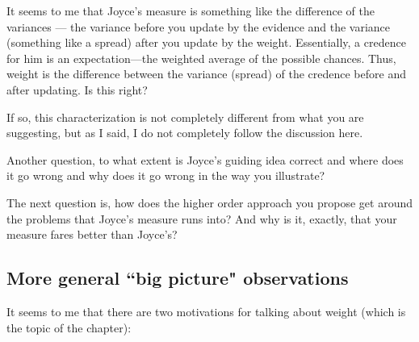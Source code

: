 \documentclass[
  10pt,
  dvipsnames,enabledeprecatedfontcommands]{scrartcl}
\begin{document}
It seems to me that Joyce's measure is something like the difference of
the variances --- the variance before you update by the evidence and the
variance (something like a spread) after you update by the weight.
Essentially, a credence for him is an expectation---the weighted average
of the possible chances. Thus, weight is the difference between the
variance (spread) of the credence before and after updating. Is this
right?

If so, this characterization is not completely different from what you
are suggesting, but as I said, I do not completely follow the discussion
here.

Another question, to what extent is Joyce's guiding idea correct and
where does it go wrong and why does it go wrong in the way you
illustrate?

The next question is, how does the higher order approach you propose get
around the problems that Joyce's measure runs into? And why is it,
exactly, that your measure fares better than Joyce's?

\hypertarget{more-general-big-picture-observations}{%
\subsection{More general ``big picture"
observations}\label{more-general-big-picture-observations}}

It seems to me that there are two motivations for talking about weight
(which is the topic of the chapter):
\end{document}

